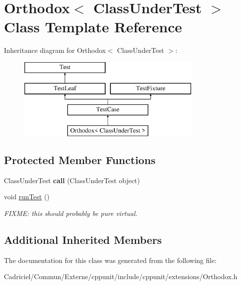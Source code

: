 \hypertarget{class_orthodox}{}\section{Orthodox$<$ Class\+Under\+Test $>$ Class Template Reference}
\label{class_orthodox}
Inheritance diagram for Orthodox$<$ Class\+Under\+Test $>$\+:\begin{figure}[H]
\begin{center}
\leavevmode
\includegraphics[height=4.000000cm]{class_orthodox}
\end{center}
\end{figure}
\subsection*{Protected Member Functions}
\begin{DoxyCompactItemize}
\item 
Class\+Under\+Test {\bfseries call} (Class\+Under\+Test object)\hypertarget{class_orthodox_a08e9feb769578cb7a8b92c7c2c5d1874}{}\label{class_orthodox_a08e9feb769578cb7a8b92c7c2c5d1874}

\item 
void \hyperlink{class_orthodox_aaeaafea272fdce3b5b2f33882cb33d8c}{run\+Test} ()\hypertarget{class_orthodox_aaeaafea272fdce3b5b2f33882cb33d8c}{}\label{class_orthodox_aaeaafea272fdce3b5b2f33882cb33d8c}

\begin{DoxyCompactList}\small\item\em F\+I\+X\+ME\+: this should probably be pure virtual. \end{DoxyCompactList}\end{DoxyCompactItemize}
\subsection*{Additional Inherited Members}


The documentation for this class was generated from the following file\+:\begin{DoxyCompactItemize}
\item 
Cadriciel/\+Commun/\+Externe/cppunit/include/cppunit/extensions/Orthodox.\+h\end{DoxyCompactItemize}
